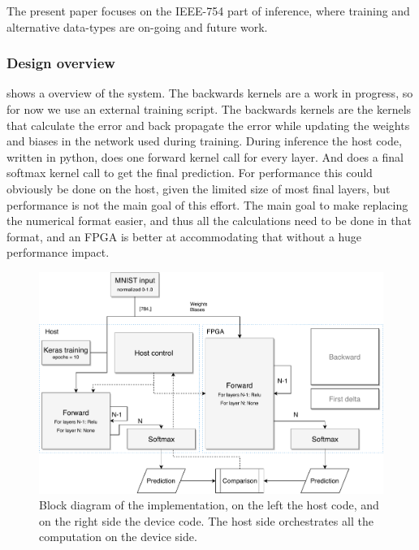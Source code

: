 \documentclass[techrep,english]{ipsj} %
\begin{document}
The present paper focuses on the IEEE-754 part of inference, where training and alternative data-types are on-going and future work.

\subsubsection{Design overview}
 shows a overview of the system.
The backwards kernels are a work in progress, so for now we use an external training script.
The backwards kernels are the kernels that calculate the error and back propagate the error while updating the weights and biases in the network used during training.
During inference the host code, written in python, does one forward kernel call for every layer.
And does a final softmax kernel call to get the final prediction.
For performance this could obviously be done on the host, given the limited size of most final layers, but performance is not the main goal of this effort.
The main goal to make replacing the numerical format easier, and thus all the calculations need to be done in that format, and an FPGA is better at accommodating that without a huge performance impact.

\begin{figure}[p]
  \centering
  \includegraphics[width=0.7\linewidth]{block-diagram.pdf}
  \caption{Block diagram of the implementation, on the left the host code, and on the right side the device code. The host side orchestrates all the computation on the device side.}\label{fig:block-diagram}
\end{figure}
\end{document}
